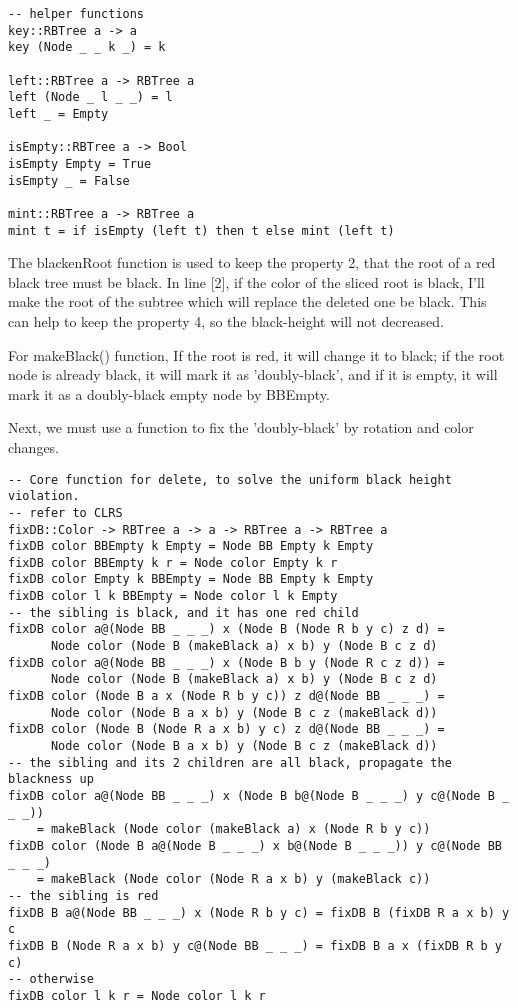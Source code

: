 \documentclass{article}
\begin{document}
\begin{lstlisting}
-- helper functions
key::RBTree a -> a
key (Node _ _ k _) = k

left::RBTree a -> RBTree a
left (Node _ l _ _) = l
left _ = Empty

isEmpty::RBTree a -> Bool
isEmpty Empty = True
isEmpty _ = False

mint::RBTree a -> RBTree a
mint t = if isEmpty (left t) then t else mint (left t)
\end{lstlisting}

The blackenRoot function is used to keep the property 2, that the root of a red black tree
must be black. In line [2], if the color of the sliced root is black, I'll make the root 
of the subtree which will replace the deleted one be black. This can help to keep the property
4, so the black-height will not decreased.

For makeBlack() function, If the root is red, it will change it to black; if the root node is 
already black, it will mark it as 'doubly-black', and if it is empty, it will mark it as a 
doubly-black empty node by BBEmpty.

Next, we must use a function to fix the 'doubly-black' by rotation and color changes.

\begin{lstlisting}
-- Core function for delete, to solve the uniform black height violation.
-- refer to CLRS
fixDB::Color -> RBTree a -> a -> RBTree a -> RBTree a
fixDB color BBEmpty k Empty = Node BB Empty k Empty
fixDB color BBEmpty k r = Node color Empty k r
fixDB color Empty k BBEmpty = Node BB Empty k Empty
fixDB color l k BBEmpty = Node color l k Empty
-- the sibling is black, and it has one red child
fixDB color a@(Node BB _ _ _) x (Node B (Node R b y c) z d) = 
      Node color (Node B (makeBlack a) x b) y (Node B c z d)
fixDB color a@(Node BB _ _ _) x (Node B b y (Node R c z d)) = 
      Node color (Node B (makeBlack a) x b) y (Node B c z d)
fixDB color (Node B a x (Node R b y c)) z d@(Node BB _ _ _) = 
      Node color (Node B a x b) y (Node B c z (makeBlack d))
fixDB color (Node B (Node R a x b) y c) z d@(Node BB _ _ _) = 
      Node color (Node B a x b) y (Node B c z (makeBlack d))
-- the sibling and its 2 children are all black, propagate the blackness up
fixDB color a@(Node BB _ _ _) x (Node B b@(Node B _ _ _) y c@(Node B _ _ _))
    = makeBlack (Node color (makeBlack a) x (Node R b y c))
fixDB color (Node B a@(Node B _ _ _) x b@(Node B _ _ _)) y c@(Node BB _ _ _)
    = makeBlack (Node color (Node R a x b) y (makeBlack c))
-- the sibling is red
fixDB B a@(Node BB _ _ _) x (Node R b y c) = fixDB B (fixDB R a x b) y c
fixDB B (Node R a x b) y c@(Node BB _ _ _) = fixDB B a x (fixDB R b y c)
-- otherwise
fixDB color l k r = Node color l k r
\end{lstlisting}
\end{document}
